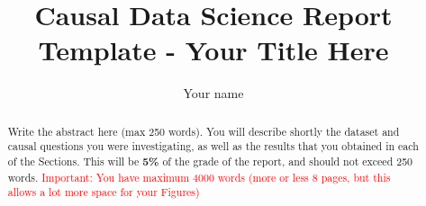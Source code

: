 \documentclass[sigconf]{acmart}
\begin{document}
\title{Causal Data Science Report Template - Your Title Here}

\author{Your name}


\begin{abstract}
Write the abstract here (max 250 words).
You will describe shortly the dataset and causal questions you were investigating, as well as the results that you obtained in each of the Sections.
This will be \textbf{5\%} of the grade of the report, and should not exceed 250 words.
\textcolor{red}{Important: You have maximum 4000 words (more or less 8 pages, but this allows a lot more space for your Figures)}

\end{abstract}



\maketitle
\pagestyle{plain} %




\end{document}
